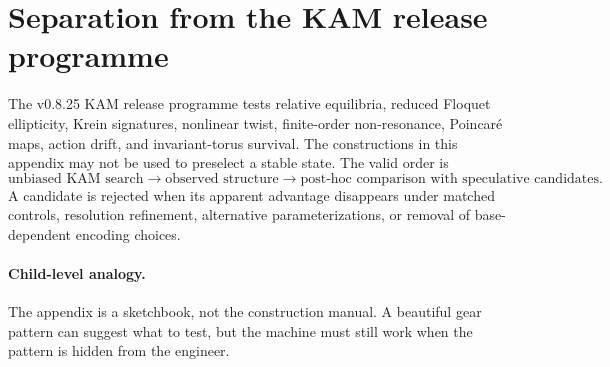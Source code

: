 \documentclass[11pt]{article}
\begin{document}
\section{Separation from the KAM release programme}

The v0.8.25 KAM release programme tests relative equilibria, reduced Floquet
ellipticity, Krein signatures, nonlinear twist, finite-order non-resonance,
Poincar\'e maps, action drift, and invariant-torus survival.  The constructions
in this appendix may not be used to preselect a stable state.  The valid order
is
\begin{equation}
    \text{unbiased KAM search}
    \longrightarrow
    \text{observed structure}
    \longrightarrow
    \text{post-hoc comparison with speculative candidates}.
\end{equation}
A candidate is rejected when its apparent advantage disappears under matched
controls, resolution refinement, alternative parameterizations, or removal of
base-dependent encoding choices.

\paragraph{Child-level analogy.}
The appendix is a sketchbook, not the construction manual.  A beautiful gear
pattern can suggest what to test, but the machine must still work when the
pattern is hidden from the engineer.
\end{document}
